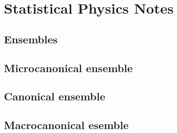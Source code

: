 \documentclass[letterpaper,10pt,english]{jupyterBook}
\begin{document}
\chapter{Statistical Physics \sphinxhyphen{} Notes}
\label{\detokenize{ch/statistical-mechanics/notes:statistical-physics-notes}}\label{\detokenize{ch/statistical-mechanics/notes:statistical-mechanics-notes}}\label{\detokenize{ch/statistical-mechanics/notes::doc}}

\section{Ensembles}
\label{\detokenize{ch/statistical-mechanics/notes:ensembles}}\label{\detokenize{ch/statistical-mechanics/notes:statistical-mechanics-notes-ensembles}}

\section{Microcanonical ensemble}
\label{\detokenize{ch/statistical-mechanics/notes:microcanonical-ensemble}}\label{\detokenize{ch/statistical-mechanics/notes:id1}}

\section{Canonical ensemble}
\label{\detokenize{ch/statistical-mechanics/notes:canonical-ensemble}}\label{\detokenize{ch/statistical-mechanics/notes:id2}}

\section{Macrocanonical esemble}
\label{\detokenize{ch/statistical-mechanics/notes:macrocanonical-esemble}}\label{\detokenize{ch/statistical-mechanics/notes:id3}}
\end{document}
